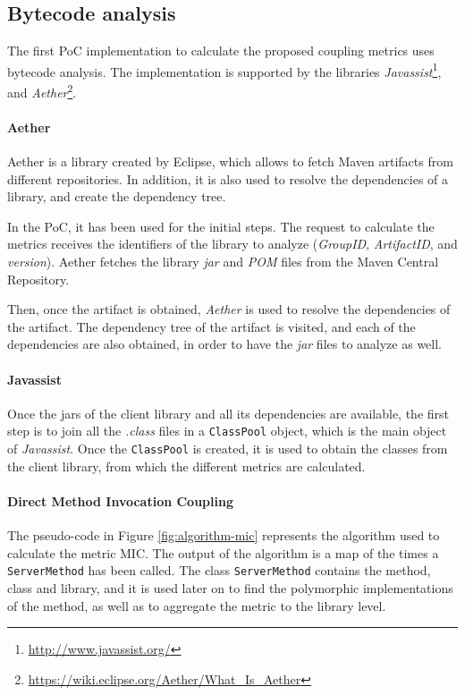 \subsection{Bytecode analysis}
The first PoC implementation to calculate the proposed coupling metrics uses bytecode analysis. The implementation is supported by the libraries \textit{Javassist}\footnote{\url{http://www.javassist.org/}}, and \textit{Aether}\footnote{\url{https://wiki.eclipse.org/Aether/What_Is_Aether}}.

\paragraph{Aether}
Aether is a library created by Eclipse, which allows to fetch Maven artifacts from different repositories. In addition, it is also used to resolve the dependencies of a library, and create the dependency tree. %

In the PoC, it has been used for the initial steps. The request to calculate the metrics receives the identifiers of the library to analyze (\textit{GroupID}, \textit{ArtifactID}, and \textit{version}). Aether fetches the library \textit{jar} and \textit{POM} files from the Maven Central Repository.

Then, once the artifact is obtained, \textit{Aether} is used to resolve the dependencies of the artifact. The dependency tree of the artifact is visited, and each of the dependencies are also obtained, in order to have the \textit{jar} files to analyze as well.

\paragraph{Javassist}
Once the jars of the client library and all its dependencies are available, the first step is to join all the \textit{.class} files in a \texttt{ClassPool} object, which is the main object of \textit{Javassist}. Once the \texttt{ClassPool} is created, it is used to obtain the classes from the client library, from which the different metrics are calculated.

\paragraph{Direct Method Invocation Coupling} %
The pseudo-code in Figure \ref{fig:algorithm-mic} represents the algorithm used to calculate the metric MIC. The output of the algorithm is a map of the times a \texttt{ServerMethod} has been called. The class \texttt{ServerMethod} contains the method, class and library, and it is used later on to find the polymorphic implementations of the method, as well as to aggregate the metric to the library level.

